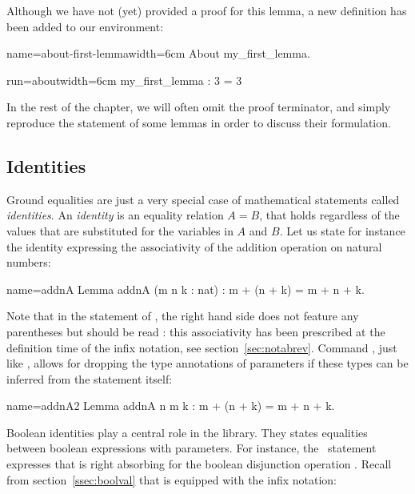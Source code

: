 Although we have not (yet) provided a proof for this lemma, a new
definition has been added to our environment:

\begin{coq}{name=about-first-lemma}{width=6cm}
About my_first_lemma.
\end{coq}
\begin{coqout}{run=about}{width=6cm}
my_first_lemma : 3 = 3
\end{coqout}


In the rest of the chapter, we will often omit the  proof
terminator, and simply reproduce the statement of some lemmas in
order to discuss their formulation.

\subsection{Identities}\label{ssec:id}

Ground equalities are just a very special case of mathematical
statements called \emph{identities}. An \emph{identity} is an equality
relation $A = B$, that holds regardless of the values that are
substituted for the variables in $A$ and $B$.
Let us state for instance the identity expressing the associativity of
the addition operation on natural numbers:

\begin{coq}{name=addnA}{}
Lemma addnA (m n k : nat) : m + (n + k) = m + n + k.
\end{coq}

Note that in the statement of , the right hand side does not
feature any parentheses but should be read : this
associativity has been prescribed at the definition time of the infix
\C{+} notation, see section~\ref{sec:notabrev}. Command
, just like , allows for
dropping the type annotations of parameters if these types can be
inferred from the statement itself:

\begin{coq}{name=addnA2}{}
Lemma addnA n m k : m + (n + k) = m + n + k.
\end{coq}

Boolean identities play a central role in the \mcbMC{} library. They
states equalities between boolean expressions with parameters. For
instance, the~ statement expresses that  is right absorbing
for the boolean disjunction operation . Recall from
section~\ref{ssec:boolval} that  is equipped with the \C{||}
infix notation:

